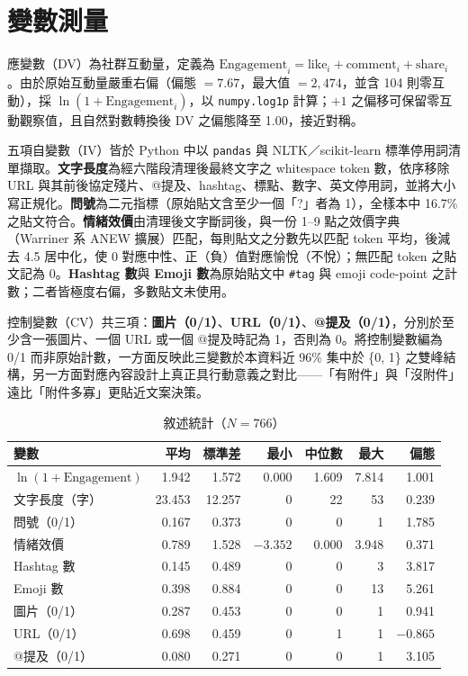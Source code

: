 \documentclass[12pt,a4paper]{ctexart}
\begin{document}
\section{變數測量}

應變數（DV）為社群互動量，定義為 $\text{Engagement}_i = \text{like}_i + \text{comment}_i + \text{share}_i$。由於原始互動量嚴重右偏（偏態 $=7.67$，最大值 $=2{,}474$，並含 104 則零互動），採 $\ln(1+\text{Engagement}_i)$，以 \texttt{numpy.log1p} 計算；$+1$ 之偏移可保留零互動觀察值，且自然對數轉換後 DV 之偏態降至 1.00，接近對稱。

五項自變數（IV）皆於 Python 中以 \texttt{pandas} 與 NLTK／scikit-learn 標準停用詞清單擷取。\textbf{文字長度}為經六階段清理後最終文字之 whitespace token 數，依序移除 URL 與其前後協定殘片、@提及、hashtag、標點、數字、英文停用詞，並將大小寫正規化。\textbf{問號}為二元指標（原始貼文含至少一個「?」者為 1），全樣本中 16.7\% 之貼文符合。\textbf{情緒效價}由清理後文字斷詞後，與一份 1--9 點之效價字典（Warriner 系 ANEW 擴展）匹配，每則貼文之分數先以匹配 token 平均，後減去 4.5 居中化，使 0 對應中性、正（負）值對應愉悅（不悅）；無匹配 token 之貼文記為 0。\textbf{Hashtag 數}與 \textbf{Emoji 數}為原始貼文中 \texttt{\#tag} 與 emoji code-point 之計數；二者皆極度右偏，多數貼文未使用。

控制變數（CV）共三項：\textbf{圖片（0/1）}、\textbf{URL（0/1）}、\textbf{@提及（0/1）}，分別於至少含一張圖片、一個 URL 或一個 @提及時記為 1，否則為 0。將控制變數編為 0/1 而非原始計數，一方面反映此三變數於本資料近 96\% 集中於 \{0, 1\} 之雙峰結構，另一方面對應內容設計上真正具行動意義之對比——「有附件」與「沒附件」遠比「附件多寡」更貼近文案決策。

\begin{table}[H]
\centering\small
\caption{敘述統計（$N=766$）}
\begin{tabular}{lrrrrrr}
\toprule
變數 & 平均 & 標準差 & 最小 & 中位數 & 最大 & 偏態 \\
\midrule
$\ln(1+\text{Engagement})$ & 1.942 & 1.572 & 0.000 & 1.609 & 7.814 & 1.001 \\
文字長度（字）& 23.453 & 12.257 & 0 & 22 & 53 & 0.239 \\
問號（0/1）& 0.167 & 0.373 & 0 & 0 & 1 & 1.785 \\
情緒效價 & 0.789 & 1.528 & $-3.352$ & 0.000 & 3.948 & 0.371 \\
Hashtag 數 & 0.145 & 0.489 & 0 & 0 & 3 & 3.817 \\
Emoji 數 & 0.398 & 0.884 & 0 & 0 & 13 & 5.261 \\
圖片（0/1）& 0.287 & 0.453 & 0 & 0 & 1 & 0.941 \\
URL（0/1）& 0.698 & 0.459 & 0 & 1 & 1 & $-0.865$ \\
@提及（0/1）& 0.080 & 0.271 & 0 & 0 & 1 & 3.105 \\
\bottomrule
\end{tabular}
\end{table}
\end{document}
